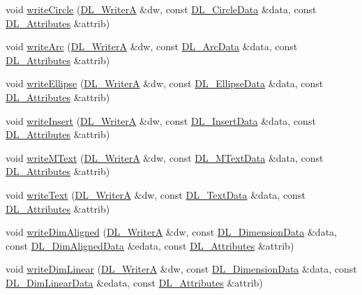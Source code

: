 \begin{DoxyCompactItemize}
void \hyperlink{classDL__Jww_a31380c1fd71a80c4c5bc971fa9b75700}{write\-Circle} (\hyperlink{classDL__WriterA}{D\-L\-\_\-\-Writer\-A} \&dw, const \hyperlink{structDL__CircleData}{D\-L\-\_\-\-Circle\-Data} \&data, const \hyperlink{classDL__Attributes}{D\-L\-\_\-\-Attributes} \&attrib)
\item 
void \hyperlink{classDL__Jww_a1a9da4bf1b26a3466afadda87fc3e56d}{write\-Arc} (\hyperlink{classDL__WriterA}{D\-L\-\_\-\-Writer\-A} \&dw, const \hyperlink{structDL__ArcData}{D\-L\-\_\-\-Arc\-Data} \&data, const \hyperlink{classDL__Attributes}{D\-L\-\_\-\-Attributes} \&attrib)
\item 
void \hyperlink{classDL__Jww_a8c06577ca47cea35fafb6f568c19a8b5}{write\-Ellipse} (\hyperlink{classDL__WriterA}{D\-L\-\_\-\-Writer\-A} \&dw, const \hyperlink{structDL__EllipseData}{D\-L\-\_\-\-Ellipse\-Data} \&data, const \hyperlink{classDL__Attributes}{D\-L\-\_\-\-Attributes} \&attrib)
\item 
void \hyperlink{classDL__Jww_a0099b398f95cb2ebaadbf8cc5e5da26b}{write\-Insert} (\hyperlink{classDL__WriterA}{D\-L\-\_\-\-Writer\-A} \&dw, const \hyperlink{structDL__InsertData}{D\-L\-\_\-\-Insert\-Data} \&data, const \hyperlink{classDL__Attributes}{D\-L\-\_\-\-Attributes} \&attrib)
\item 
void \hyperlink{classDL__Jww_aba56a9a5b0f8d87ff0f67bcfab58f2fd}{write\-M\-Text} (\hyperlink{classDL__WriterA}{D\-L\-\_\-\-Writer\-A} \&dw, const \hyperlink{structDL__MTextData}{D\-L\-\_\-\-M\-Text\-Data} \&data, const \hyperlink{classDL__Attributes}{D\-L\-\_\-\-Attributes} \&attrib)
\item 
void \hyperlink{classDL__Jww_abcdaff0bca8ced6c94e3cff9e3c758b1}{write\-Text} (\hyperlink{classDL__WriterA}{D\-L\-\_\-\-Writer\-A} \&dw, const \hyperlink{structDL__TextData}{D\-L\-\_\-\-Text\-Data} \&data, const \hyperlink{classDL__Attributes}{D\-L\-\_\-\-Attributes} \&attrib)
\item 
void \hyperlink{classDL__Jww_a29bdac82f784c2c5da01c848db044b73}{write\-Dim\-Aligned} (\hyperlink{classDL__WriterA}{D\-L\-\_\-\-Writer\-A} \&dw, const \hyperlink{structDL__DimensionData}{D\-L\-\_\-\-Dimension\-Data} \&data, const \hyperlink{structDL__DimAlignedData}{D\-L\-\_\-\-Dim\-Aligned\-Data} \&edata, const \hyperlink{classDL__Attributes}{D\-L\-\_\-\-Attributes} \&attrib)
\item 
void \hyperlink{classDL__Jww_a3fc9a2f3a0b6acffe398d7fd4f7286b3}{write\-Dim\-Linear} (\hyperlink{classDL__WriterA}{D\-L\-\_\-\-Writer\-A} \&dw, const \hyperlink{structDL__DimensionData}{D\-L\-\_\-\-Dimension\-Data} \&data, const \hyperlink{structDL__DimLinearData}{D\-L\-\_\-\-Dim\-Linear\-Data} \&edata, const \hyperlink{classDL__Attributes}{D\-L\-\_\-\-Attributes} \&attrib)

\end{DoxyCompactItemize}
